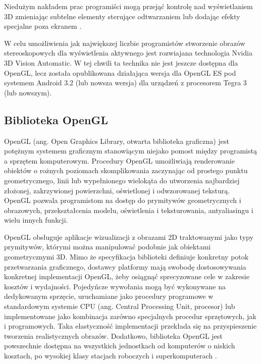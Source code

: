 Niedużym nakładem prac programiści mogą przejąć kontrolę nad wyświetlaniem 3D zmieniając subtelne elementy sterujące odtwarzaniem lub dodając efekty specjalne poza ekranem \cite{3dVisionInfo}. 

W celu umożliwienia jak największej liczbie programistów stworzenie obrazów stereoskopowych dla wyświetlenia aktywnego jest rozwiajana technologia Nvidia 3D Vision Automatic. W tej chwili ta technika nie jest jeszcze dostępna dla OpenGL, lecz została opublikowana działająca wersja dla OpenGL ES pod systemem Android 3.2 (lub nowsza wersja) dla urządzeń z procesorem Tegra 3 (lub nowszym).

\newpage
\subsection{Biblioteka OpenGL}
OpenGL (ang. Open Graphics Library, otwarta biblioteka graficzna) jest potężnym systemem graficznym stanowiącym niejako pomost między programistą a sprzętem komputerowym. Procedury OpenGL umożliwiają renderowanie obiektów o rożnych poziomach skomplikowania zaczynając od prostego punktu geometrycznego, linii lub wypełnionego wielokąta do utworzenia najbardziej złożonej, zakrzywionej powierzchni, oświetlonej i odwzorowanej teksturą. OpenGL pozwala programistom na dostęp do prymitywów geometrycznych i obrazowych, przekształcenia modelu, oświetlenia i teksturowania, antyaliasingu i wielu innych funkcji. 

OpenGL obsługuje aplikacje wizualizacji z obrazami 2D traktowanymi jako typy prymitywów, którymi można manipulować podobnie jak obiektami geometrycznymi 3D. Mimo że specyfikacja biblioteki definiuje konkretny potok przetwarzania graficznego, dostawcy platformy mają swobodę dostosowywania konkretnej implementacji OpenGL, żeby osiągnąć sprecyzowane cele w zakresie kosztów i wydajności. Pojedyńcze wywołania mogą być wykonywane na dedykowanym sprzęcie, uruchamiane jako procedury programowe w standardowym systemie CPU (ang. Central Processing Unit, procesor) lub implementowane jako kombinacja zarówno specjalnych procedur sprzętowych, jak i programowych. Taka elastyczność implementacji przekłada się na przyspieszenie tworzenia realistycznych obrazów. Dodatkowo, biblioteka OpenGL jest powszechnie dostępna na wszystkich jednostkach od komputerów o niskich kosztach, po wysokiej klasy stacjach roboczych i superkomputerach \cite{openglofficial}.
